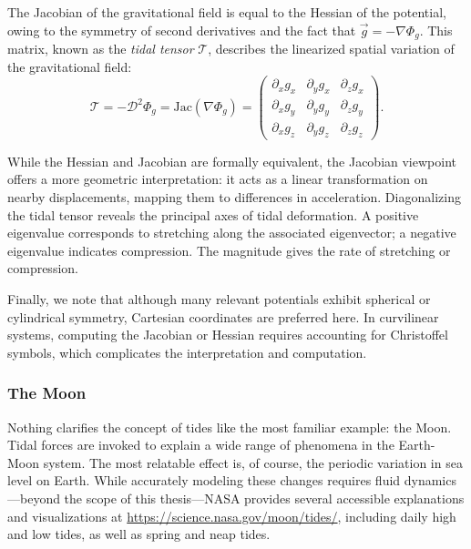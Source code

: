         The Jacobian of the gravitational field is equal to the Hessian of the potential, owing to the symmetry of second derivatives and the fact that \(\vec{g} = -\nabla \Phi_g\). This matrix, known as the \textit{tidal tensor} \(\mathcal{T}\), describes the linearized spatial variation of the gravitational field:
        \begin{equation}
            \mathcal{T} = -\mathcal{D}^2\Phi_g = \mathrm{Jac}(\nabla \Phi_g) = \left(\begin{matrix}
                \partial_x g_x & \partial_y g_x & \partial_z g_x \\
                \partial_x g_y & \partial_y g_y & \partial_z g_y \\
                \partial_x g_z & \partial_y g_z & \partial_z g_z 
            \end{matrix}\right).
        \end{equation}

        While the Hessian and Jacobian are formally equivalent, the Jacobian viewpoint offers a more geometric interpretation: it acts as a linear transformation on nearby displacements, mapping them to differences in acceleration. Diagonalizing the tidal tensor reveals the principal axes of tidal deformation. A positive eigenvalue corresponds to stretching along the associated eigenvector; a negative eigenvalue indicates compression. The magnitude gives the rate of stretching or compression.

        Finally, we note that although many relevant potentials exhibit spherical or cylindrical symmetry, Cartesian coordinates are preferred here. In curvilinear systems, computing the Jacobian or Hessian requires accounting for Christoffel symbols, which complicates the interpretation and computation.
        
        \subsubsection{The Moon}
            Nothing clarifies the concept of tides like the most familiar example: the Moon. Tidal forces are invoked to explain a wide range of phenomena in the Earth-Moon system. The most relatable effect is, of course, the periodic variation in sea level on Earth. While accurately modeling these changes requires fluid dynamics—beyond the scope of this thesis—NASA provides several accessible explanations and visualizations at \href{https://science.nasa.gov/moon/tides/}{https://science.nasa.gov/moon/tides/}, including daily high and low tides, as well as spring and neap tides.

